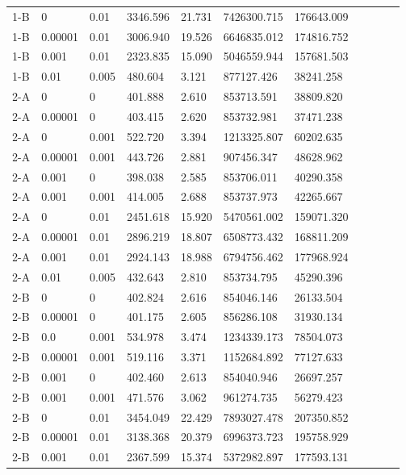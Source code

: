 \documentclass{tamuccthesis}
\begin{document}
\begin{appendices}
\begin{small}
\begin{longtable}{lllllllllll}
    1-B &     0   &  0.01 & 3346.596 & 21.731 & 7426300.715 & 176643.009 \\
    1-B & 0.00001 &  0.01 & 3006.940 & 19.526 & 6646835.012 & 174816.752 \\
    1-B & 0.001 &  0.01 & 2323.835 & 15.090 & 5046559.944 & 157681.503 \\
    1-B &  0.01 & 0.005 &  480.604 &  3.121 &  877127.426 &  38241.258 \\
    2-A &         0 &   0 & 401.888 & 2.610 &  853713.591 & 38809.820 \\
    2-A & 0.00001 &     0 & 403.415 & 2.620 &  853732.981 & 37471.238 \\
    2-A &       0 & 0.001 & 522.720 & 3.394 & 1213325.807 & 60202.635 \\
    2-A & 0.00001 & 0.001 & 443.726 & 2.881 &  907456.347 & 48628.962 \\
    2-A & 0.001   &     0 &  398.038 &  2.585 &  853706.011 &  40290.358 \\
    2-A & 0.001   & 0.001 &  414.005 &  2.688 &  853737.973 &  42265.667 \\
    2-A &     0   &  0.01 & 2451.618 & 15.920 & 5470561.002 & 159071.320 \\
    2-A & 0.00001 &  0.01 & 2896.219 & 18.807 & 6508773.432 & 168811.209 \\
    2-A & 0.001 &  0.01 & 2924.143 & 18.988 & 6794756.462 & 177968.924 \\
    2-A &  0.01 & 0.005 &  432.643 &  2.810 &  853734.795 &  45290.396 \\
    2-B &       0 &     0 & 402.824 & 2.616 &  854046.146 & 26133.504 \\
    2-B & 0.00001 &     0 & 401.175 & 2.605 &  856286.108 & 31930.134 \\
    2-B &     0.0 & 0.001 & 534.978 & 3.474 & 1234339.173 & 78504.073 \\
    2-B & 0.00001 & 0.001 & 519.116 & 3.371 & 1152684.892 & 77127.633 \\
    2-B & 0.001   &     0 &  402.460 &  2.613 &  854040.946 &  26697.257 \\
    2-B & 0.001   & 0.001 &  471.576 &  3.062 &  961274.735 &  56279.423 \\
    2-B &     0   &  0.01 & 3454.049 & 22.429 & 7893027.478 & 207350.852 \\
    2-B & 0.00001 &  0.01 & 3138.368 & 20.379 & 6996373.723 & 195758.929 \\
    2-B & 0.001 &  0.01 & 2367.599 & 15.374 & 5372982.897 & 177593.131 \\

\end{longtable}
\end{small}
\end{appendices}
\end{document}
